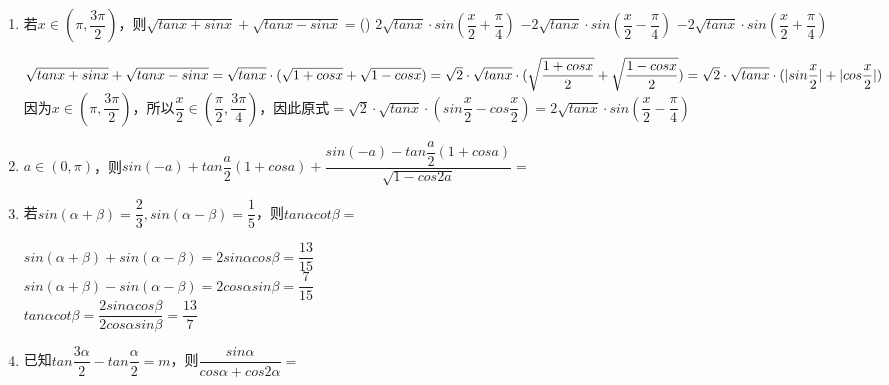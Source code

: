 \begin{enumerate}
\begin{enumerate}
\begin{jieda}
            $\sqrt{\dfrac{1}{2}+\dfrac{1}{2}cos2\alpha} = \sqrt{cos^2\alpha}$，因为$2\alpha \in (\dfrac{3\pi}{2}, 2\pi)$，所以$\sqrt{\dfrac{1}{2}+\dfrac{1}{2}cos2\alpha} = -cos\alpha$，\\
            $\sqrt{\dfrac{1}{2}-\dfrac{1}{2}cos\alpha} = \sqrt{sin^2\dfrac{\alpha}{2}}$，因为$2\alpha \in (\dfrac{3\pi}{2}, 2\pi)$，所以选A.
        \end{jieda}
        \item 若$x \in (\pi, \dfrac{3\pi}{2})$，则$\sqrt{tanx + sinx} + \sqrt{tanx - sinx} = $\dotfill()
        {$2\sqrt{tanx} \cdot sin(\dfrac{x}{2} + \dfrac{\pi}{4})$}
        {$-2\sqrt{tanx} \cdot sin(\dfrac{x}{2} - \dfrac{\pi}{4})$}
        {$-2\sqrt{tanx} \cdot sin(\dfrac{x}{2} + \dfrac{\pi}{4})$}
        \begin{jieda}
            $\sqrt{tanx + sinx} + \sqrt{tanx - sinx} = \sqrt{tanx}\cdot(\sqrt{1+cosx}+\sqrt{1-cosx}) \\
            = \sqrt{2} \cdot \sqrt{tanx}\cdot(\sqrt{\dfrac{1+cosx}{2}}+\sqrt{\dfrac{1-cosx}{2}}) = \sqrt{2} \cdot \sqrt{tanx}\cdot (|sin\dfrac{x}{2}| + |cos\dfrac{x}{2}|)$ \\
            因为$x \in (\pi, \dfrac{3\pi}{2})$，所以$\dfrac{x}{2} \in (\dfrac{\pi}{2}, \dfrac{3\pi}{4})$，因此原式$=  \sqrt{2} \cdot \sqrt{tanx}\cdot (sin\dfrac{x}{2} - cos\dfrac{x}{2}) = 2\sqrt{tanx}\cdot sin(\dfrac{x}{2} - \dfrac{\pi}{4})$
        \end{jieda}
        \item $a \in (0, \pi)$，则$sin(-a) + tan\dfrac{a}{2}(1+cosa)+\dfrac{sin(-a)-tan\dfrac{a}{2}(1+cosa)}{\sqrt{1-cos2a}} = $
        \item 若$sin(\alpha+\beta) = \dfrac{2}{3}, sin(\alpha - \beta) = \dfrac{1}{5}$，则$tan\alpha cot\beta = $
        \begin{jieda}
            $sin(\alpha+\beta) + sin(\alpha - \beta) = 2sin\alpha cos\beta = \dfrac{13}{15}$ \\
            $sin(\alpha+\beta) - sin(\alpha - \beta) = 2cos\alpha sin\beta = \dfrac{7}{15}$ \\
            $tan\alpha cot\beta = \dfrac{2sin\alpha cos\beta}{2cos\alpha sin\beta} = \dfrac{13}{7}$
        \end{jieda}
        \item 已知$tan\dfrac{3\alpha}{2} - tan\dfrac{\alpha}{2} = m$，则$\dfrac{sin\alpha}{cos\alpha + cos2\alpha} =$

\end{enumerate}
\end{enumerate}
